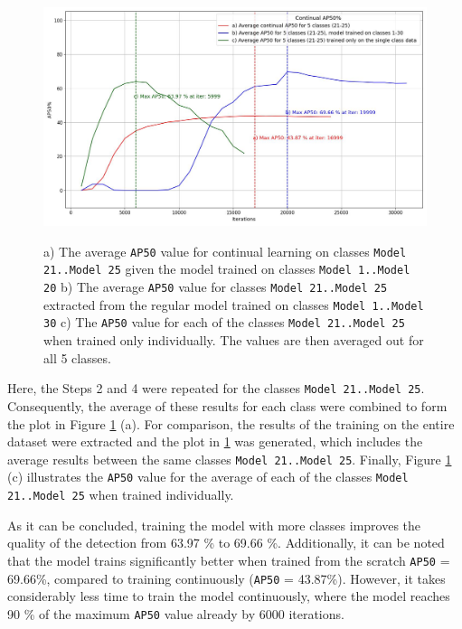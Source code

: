 \begin{figure}[htb]
	\begin{center}
		\includegraphics[width=14cm]{./continualAP_average.jpg}
	\end{center}
	\caption{a) The average \texttt{AP50} value for continual learning on classes \texttt{Model 21..Model 25} given the model trained on classes \texttt{Model 1..Model 20}  b) The average \texttt{AP50} value for classes \texttt{Model 21..Model 25} extracted from the regular model trained on classes \texttt{Model 1..Model 30} c)  The \texttt{AP50} value for each of the classes \texttt{Model 21..Model 25} when trained only individually. The values are then averaged out for all 5 classes.}
	\begin{center}	\label{myModel_continuous_experiment_2}
	\end{center}
\end{figure}
\FloatBarrier

  
Here,  the Steps 2 and 4 were repeated for the classes \texttt{Model 21..Model 25}. Consequently, the average of these results for each class were combined to form the plot in Figure \ref{myModel_continuous_experiment_2} (a). For  comparison, the results of the training on the entire dataset were extracted and the plot in  \ref{myModel_continuous_experiment_2} was generated, which includes the average results between the same classes \texttt{Model 21..Model 25}. Finally, Figure \ref{myModel_continuous_experiment_2} (c) illustrates the \texttt{AP50} value for the average of each of the classes \texttt{Model 21..Model 25} when trained individually. 

As it can be concluded, training the model with more classes improves the quality of the detection from 63.97 \% to 69.66 \%. Additionally, it can be noted that the model trains significantly better when trained from the scratch \texttt{AP50} = 69.66\%, compared to training continuously (\texttt{AP50} = 43.87\%). However, it takes considerably less time to train the model continuously, where the model reaches 90 \% of the maximum \texttt{AP50} value already by 6000 iterations.

